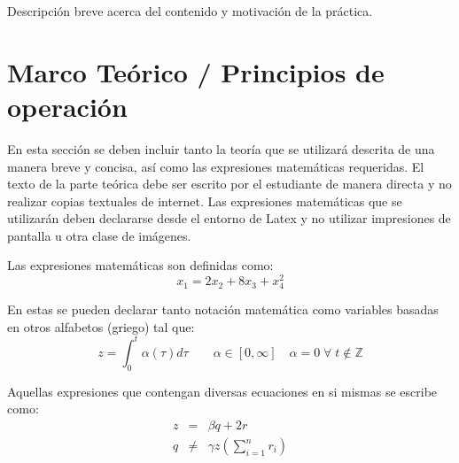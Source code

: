 \documentclass[11pt,onside]{article}
\begin{document}
Descripción breve acerca del contenido y motivación de la práctica.

\section{Marco Teórico / Principios de operación}

En esta sección se deben incluir tanto la teoría que se utilizará descrita de una manera breve y concisa, así como las expresiones matemáticas requeridas. El texto de la parte teórica debe ser escrito por el estudiante de manera directa y no realizar copias textuales de internet. Las expresiones matemáticas que se utilizarán deben declararse desde el entorno de Latex y no utilizar impresiones de pantalla u otra clase de imágenes.

Las expresiones matemáticas son definidas como:
\begin{equation}
    x_{1}=2 x_{2}+8x_{3} +x_{4}^{2}
\end{equation}

En estas se pueden declarar tanto notación matemática como variables basadas en otros alfabetos (griego) tal que:
\begin{equation}
    z=\int_{0}^{t} \alpha(\tau) d\tau \qquad \alpha \in [0,\infty] \quad \alpha=0 \; \forall \; t \notin \mathbb{Z}
\end{equation}

Aquellas expresiones que contengan diversas ecuaciones en si mismas se escribe como:
\begin{equation}
    \begin{array}{rcl}
         z&=  & \beta q +2 r \\
         q&\neq  & \gamma z  \left( \sum_{i=1}^{n} r_{i} \right)
    \end{array}
\end{equation}
\end{document}
